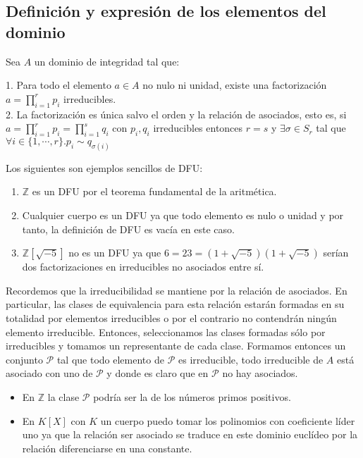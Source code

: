 \subsection{Definición y expresión de los elementos del dominio}

\begin{definition}
Sea $A$ un dominio de integridad tal que:

1. Para todo el elemento $a \in A$ no nulo ni unidad, existe una factorización $a = \prod_{i = 1}^{r} p_i$ irreducibles. \\
2. La factorización es única salvo el orden y la relación de asociados, esto es, si $a = \prod_{i = 1}^r p_i = \prod_{i = 1}^s q_i$ con $p_i,q_i$ irreducibles entonces $r = s$ y $\exists \sigma \in S_r$ tal que $\forall i \in \{1,\cdots,r\}.p_i \sim q_{\sigma(i)}$ 
\end{definition}

\begin{example}
Los siguientes son ejemplos sencillos de DFU:

\begin{enumerate}
\item $\mathbb{Z}$ es un DFU por el teorema fundamental de la aritmética. 
\item Cualquier cuerpo es un DFU ya que todo elemento es nulo o unidad y por tanto, la definición de DFU es vacía en este caso. 
\item $\mathbb{Z}[\sqrt{-5}]$ no es un DFU ya que $6 = 23 = (1+\sqrt{-5})(1+\sqrt{-5})$ serían dos factorizaciones en irreducibles no asociados entre sí. 
\end{enumerate}
\end{example}

Recordemos que la irreducibilidad se mantiene por la relación de asociados. En particular, las clases de equivalencia para esta relación estarán formadas en su totalidad por elementos irreducibles o por el contrario no contendrán ningún elemento irreducible. Entonces, seleccionamos las clases formadas sólo por irreducibles y tomamos un representante de cada clase. Formamos entonces un conjunto $\mathcal{P}$ tal que todo elemento de $\mathcal{P}$ es irreducible, todo irreducible de $A$ está asociado con uno de $\mathcal{P}$ y donde es claro que en $\mathcal{P}$ no hay asociados. 

\begin{example}
\begin{itemize}
\item En $\mathbb{Z}$ la clase $\mathcal{P}$ podría ser la de los números primos positivos.
\item En $K[X]$ con $K$ un cuerpo puedo tomar los polinomios con coeficiente líder uno ya que la relación ser asociado se traduce en este dominio euclídeo por la relación diferenciarse en una constante. 
\end{itemize}
\end{example}

